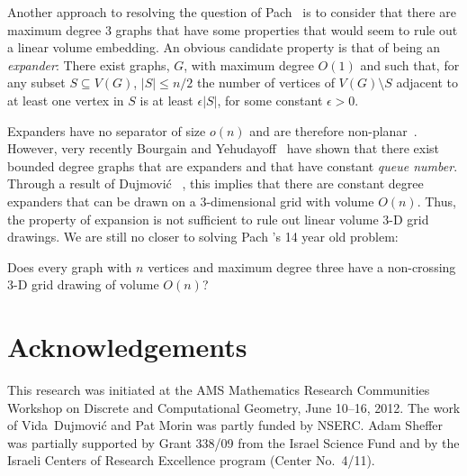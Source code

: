 \documentclass{patmorin}
\begin{document}
Another approach to resolving the question of Pach \etal\ is to consider
that there are maximum degree 3 graphs that have some properties that
would seem to rule out a linear volume embedding.  An obvious candidate
property is that of being an \emph{expander}: There exist graphs, $G$,
with maximum degree $O(1)$ and such that, for any subset $S\subseteq
V(G)$, $|S|\le n/2$ the number of vertices of $V(G)\setminus S$ adjacent
to at least one vertex in $S$ is at least $\epsilon|S|$, for some constant
$\epsilon > 0$.

Expanders have no separator of size $o(n)$ and are therefore
non-planar~\cite{lipton.tarjan:separator}.  However, very recently
Bourgain and Yehudayoff~\cite{bourgain.yehudayoff:monotone} have
shown that there exist bounded degree graphs that are expanders and
that have constant \emph{queue number}. Through a result of Dujmovi\'c
\etal~\cite[Theorem~8]{dujmovic.por.ea:track}, this implies that there
are constant degree expanders that can be drawn on a 3-dimensional grid
with volume $O(n)$. Thus, the property of expansion is not sufficient
to rule out linear volume 3-D grid drawings.  We are still no closer
to solving Pach \etal's 14 year old problem:

\begin{op}
  Does every graph with $n$ vertices and maximum degree three have a
  non-crossing 3-D grid drawing of volume $O(n)$?
\end{op}


\section*{Acknowledgements}

This research was initiated at the AMS Mathematics Research Communities
Workshop on Discrete and Computational Geometry, June 10--16, 2012.
The work of Vida~Dujmovi\'c and Pat Morin was partly funded by NSERC.
Adam Sheffer was partially supported by Grant 338/09 from the Israel
Science Fund and by the Israeli Centers of Research Excellence program
(Center No.~4/11).



\end{document}
